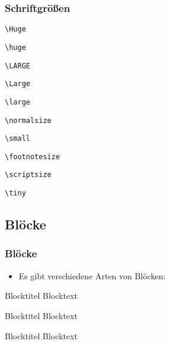 \begin{frame}[fragile]
	\frametitle{Schriftgrößen}
	
	\Huge
	\verb!\Huge!
	\normalsize
	
	\huge
	\verb!\huge!
	\normalsize
	
	\LARGE
	\verb!\LARGE!
	\normalsize
	
	\Large
	\verb!\Large!
	\normalsize
	
	\large
	\verb!\large!
	\normalsize
	
	\normalsize
	\verb!\normalsize!
	\normalsize
	
	\small%
	\verb!\small!
	\normalsize
	
	\footnotesize
	\verb!\footnotesize!
	\normalsize
	
	\scriptsize
	\verb!\scriptsize!
	\normalsize
	
	\tiny
	\verb!\tiny!
	\normalsize
\end{frame}


\subsection{Blöcke}


\begin{frame}[t]
	\frametitle{Blöcke}
	\begin{itemize}
		\item Es gibt verschiedene Arten von Blöcken:
	\end{itemize}
	\begin{block}{Blocktitel}
		Blocktext
	\end{block}
	
	\begin{exampleblock}{Blocktitel}
		Blocktext
	\end{exampleblock}
	
	\begin{alertblock}{Blocktitel}
		Blocktext
	\end{alertblock}
\end{frame}


